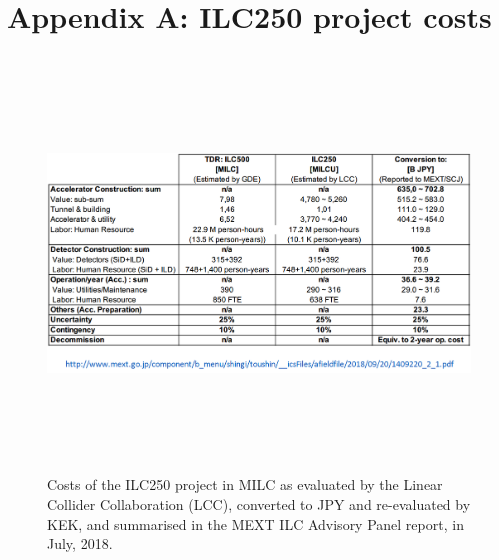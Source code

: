 \documentclass[%
 reprint,
 amsmath,amssymb,
 aps,
]{revtex4-1}
\begin{document}
\vspace{-.4cm}

%


\vspace{-.3cm}

\onecolumngrid
\newpage

\appendix


\section*{\label{Appendix1} \Large{Appendix A: ILC250 project costs}} 

\begin{figure}[ht]
 \begin{center}
 \includegraphics[width=18cm, height=11cm]{figures/Cost.png}
\caption{Costs of the ILC250 project in MILC as evaluated by the Linear Collider Collaboration (LCC), converted to JPY and re-evaluated by KEK, and summarised in the MEXT ILC Advisory Panel report, in July, 2018.
 \label{Cost}}
 \end{center}
 \end{figure}
\end{document}
